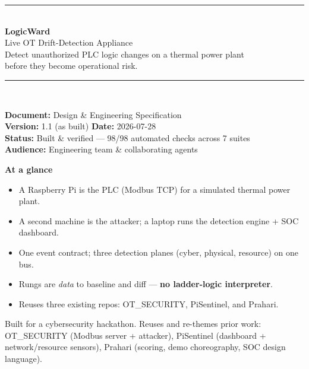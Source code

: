 \documentclass[11pt,a4paper]{article}
\begin{document}
\begin{titlepage}
\thispagestyle{empty}
\vspace*{1.2cm}
{\color{navy}\rule{\textwidth}{2.5pt}}\\[0.5cm]
{\Huge\bfseries\color{navy} LogicWard}\\[0.35cm]
{\LARGE\color{navy2} Live OT Drift-Detection Appliance}\\[0.5cm]
{\large\color{ink} Detect unauthorized PLC logic changes on a thermal power plant\\ before they become operational risk.}\\[0.3cm]
{\color{navy}\rule{\textwidth}{2.5pt}}\\[1.2cm]

\begin{tcolorbox}[colback=page,colframe=hair,boxrule=1pt,arc=3pt]
\large
\textbf{Document:} Design \& Engineering Specification \\[4pt]
\textbf{Version:} 1.1 (as built) \hfill \textbf{Date:} 2026-07-28 \\[4pt]
\textbf{Status:} Built \& verified --- 98/98 automated checks across 7 suites \\[4pt]
\textbf{Audience:} Engineering team \& collaborating agents
\end{tcolorbox}

\vspace{1cm}
{\large\bfseries\color{navy2} At a glance}
\begin{itemize}[leftmargin=1.4em,itemsep=3pt]
  \item A Raspberry Pi is the PLC (Modbus TCP) for a simulated thermal power plant.
  \item A second machine is the attacker; a laptop runs the detection engine + SOC dashboard.
  \item One event contract; three detection planes (cyber, physical, resource) on one bus.
  \item Rungs are \emph{data} to baseline and diff --- \textbf{no ladder-logic interpreter}.
  \item Reuses three existing repos: OT\_SECURITY, PiSentinel, and Prahari.
\end{itemize}

\vfill
{\small\color{muted} Built for a cybersecurity hackathon. Reuses and re-themes prior work:
OT\_SECURITY (Modbus server + attacker), PiSentinel (dashboard + network/resource sensors),
Prahari (scoring, demo choreography, SOC design language).}
\end{titlepage}
\end{document}
